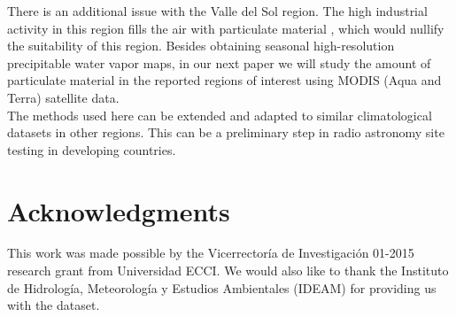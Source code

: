 \documentclass[a4paper,fleqn,usenatbib]{mnras}
\begin{document}
There is an additional issue with the Valle del Sol region. The high industrial activity in this region fills the air with particulate material \citep{sogphd,sogamoso}, which would nullify the suitability of this region. Besides obtaining seasonal high-resolution precipitable water vapor maps, in our next paper we will study the amount of particulate material in the reported regions of interest using MODIS (Aqua and Terra) satellite data.\\
  
The methods used here can be extended and adapted to similar climatological datasets in other regions. This can be a preliminary step in radio astronomy site testing in developing countries.

\section*{Acknowledgments}

This work was made possible by the Vicerrector\'ia de Investigaci\'on 01-2015 research grant from Universidad ECCI. We would also like to thank the Instituto de Hidrolog\'ia, Meteorolog\'ia y Estudios Ambientales (IDEAM) for providing us with the dataset.


 
 

%











\bsp	%
\label{lastpage}
\end{document}
